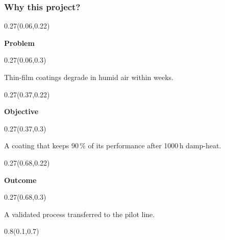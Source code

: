 \documentclass[aspectratio=169]{beamer}
\begin{document}
\begin{frame}[t]
  \frametitle{Why this project?}

\begin{textblock}{0.27}(0.06,0.22)
{\raggedright\fontsize{18}{22}\selectfont \textcolor[HTML]{5B2C83}{\textbf{Problem}}\par}
\end{textblock}

\begin{textblock}{0.27}(0.06,0.3)
{\raggedright\fontsize{15}{18}\selectfont Thin-film coatings degrade in humid air within weeks.\par}
\end{textblock}

\begin{textblock}{0.27}(0.37,0.22)
{\raggedright\fontsize{18}{22}\selectfont \textcolor[HTML]{5B2C83}{\textbf{Objective}}\par}
\end{textblock}

\begin{textblock}{0.27}(0.37,0.3)
{\raggedright\fontsize{15}{18}\selectfont A coating that keeps 90\,\% of its performance after 1000\,h damp-heat.\par}
\end{textblock}

\begin{textblock}{0.27}(0.68,0.22)
{\raggedright\fontsize{18}{22}\selectfont \textcolor[HTML]{5B2C83}{\textbf{Outcome}}\par}
\end{textblock}

\begin{textblock}{0.27}(0.68,0.3)
{\raggedright\fontsize{15}{18}\selectfont A validated process transferred to the pilot line.\par}
\end{textblock}

\begin{textblock}{0.8}(0.1,0.7)
\end{textblock}
\end{frame}
\end{document}

